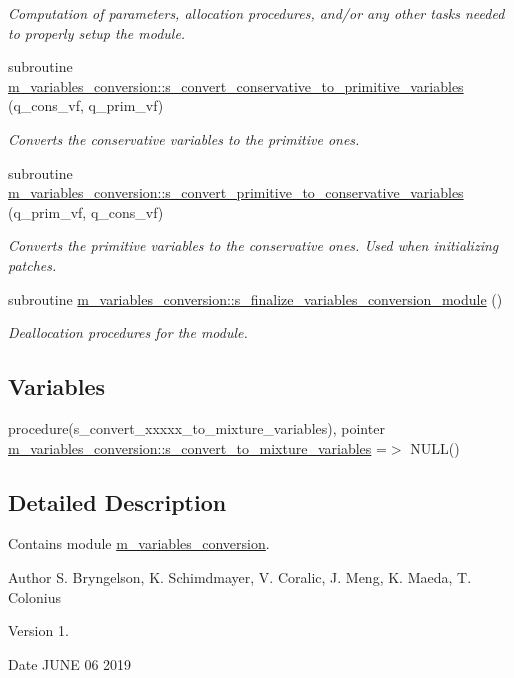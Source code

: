 \begin{DoxyCompactItemize}
\begin{DoxyCompactList}\small\item\em Computation of parameters, allocation procedures, and/or any other tasks needed to properly setup the module. \end{DoxyCompactList}\item 
subroutine \hyperlink{namespacem__variables__conversion_a589fffc2fe084855ea9e86935f1916b1}{m\+\_\+variables\+\_\+conversion\+::s\+\_\+convert\+\_\+conservative\+\_\+to\+\_\+primitive\+\_\+variables} (q\+\_\+cons\+\_\+vf, q\+\_\+prim\+\_\+vf)
\begin{DoxyCompactList}\small\item\em Converts the conservative variables to the primitive ones. \end{DoxyCompactList}\item 
subroutine \hyperlink{namespacem__variables__conversion_a63d50d6771031b79117f2aba60e0cca3}{m\+\_\+variables\+\_\+conversion\+::s\+\_\+convert\+\_\+primitive\+\_\+to\+\_\+conservative\+\_\+variables} (q\+\_\+prim\+\_\+vf, q\+\_\+cons\+\_\+vf)
\begin{DoxyCompactList}\small\item\em Converts the primitive variables to the conservative ones. Used when initializing patches. \end{DoxyCompactList}\item 
subroutine \hyperlink{namespacem__variables__conversion_a16536fea4442b05b3d639881992b9058}{m\+\_\+variables\+\_\+conversion\+::s\+\_\+finalize\+\_\+variables\+\_\+conversion\+\_\+module} ()
\begin{DoxyCompactList}\small\item\em Deallocation procedures for the module. \end{DoxyCompactList}\end{DoxyCompactItemize}
\subsection*{Variables}
\begin{DoxyCompactItemize}
\item 
procedure(s\+\_\+convert\+\_\+xxxxx\+\_\+to\+\_\+mixture\+\_\+variables), pointer \hyperlink{namespacem__variables__conversion_a3bd150e984abfe14c8269e759ea4cb60}{m\+\_\+variables\+\_\+conversion\+::s\+\_\+convert\+\_\+to\+\_\+mixture\+\_\+variables} =$>$ N\+U\+LL()
\end{DoxyCompactItemize}


\subsection{Detailed Description}
Contains module \hyperlink{namespacem__variables__conversion}{m\+\_\+variables\+\_\+conversion}. 

\begin{DoxyAuthor}{Author}
S. Bryngelson, K. Schimdmayer, V. Coralic, J. Meng, K. Maeda, T. Colonius 
\end{DoxyAuthor}
\begin{DoxyVersion}{Version}
1. 
\end{DoxyVersion}
\begin{DoxyDate}{Date}
J\+U\+NE 06 2019 
\end{DoxyDate}
